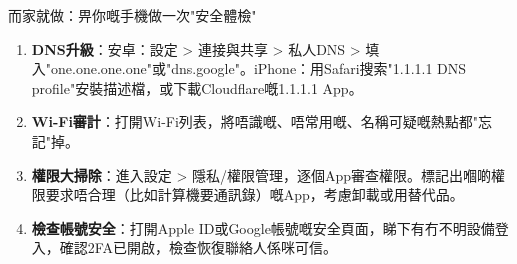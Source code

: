 \begin{tcbpractice}{而家就做：畀你嘅手機做一次"安全體檢"}
\begin{enumerate}
  \item \textbf{DNS升級}：安卓：設定 > 連接與共享 > 私人DNS > 填入"one.one.one.one"或"dns.google"。iPhone：用Safari搜索"1.1.1.1 DNS profile"安裝描述檔，或下載Cloudflare嘅1.1.1.1 App。
  \item \textbf{Wi-Fi審計}：打開Wi-Fi列表，將唔識嘅、唔常用嘅、名稱可疑嘅熱點都"忘記"掉。
  \item \textbf{權限大掃除}：進入設定 > 隱私/權限管理，逐個App審查權限。標記出嗰啲權限要求唔合理（比如計算機要通訊錄）嘅App，考慮卸載或用替代品。
  \item \textbf{檢查帳號安全}：打開Apple ID或Google帳號嘅安全頁面，睇下有冇不明設備登入，確認2FA已開啟，檢查恢復聯絡人係咪可信。
\end{enumerate}

\end{tcbpractice}
